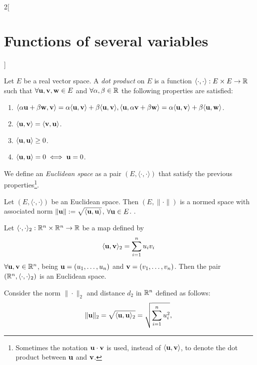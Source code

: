 \documentclass[../../../main.tex]{subfiles}
\begin{document}
\begin{multicols}{2}[\section{Functions of several variables}]
\begin{definition}
Let $E$ be a real vector space. A \textit{dot product} on $E$ is a function $\langle\cdot,\cdot\rangle:E\times E\rightarrow\mathbb{R} $ such that $\forall \vb{u},\vb{v},\vb{w}\in E$ and $\forall\alpha,\beta\in\mathbb{R} $ the following properties are satisfied:
\begin{enumerate}
    \item $\langle \alpha \vb{u}+\beta \vb{w},\vb{v}\rangle=\alpha\langle \vb{u},\vb{v}\rangle+\beta\langle \vb{u},\vb{v}\rangle,\\\langle \vb{u},\alpha \vb{v}+\beta \vb{w}\rangle=\alpha\langle \vb{u},\vb{v}\rangle+\beta\langle \vb{u},\vb{w}\rangle$.
    \item $\langle \vb{u},\vb{v}\rangle=\langle \vb{v},\vb{u}\rangle$.
    \item $\langle \vb{u},\vb{u}\rangle\geq 0$.
    \item $\langle \vb{u},\vb{u}\rangle=0\iff \vb{u}=0$.
\end{enumerate}
We define an \textit{Euclidean space} as a pair $(E,\langle\cdot,\cdot\rangle)$ that satisfy the previous properties\footnote{Sometimes the notation $\vb{u}\cdot \vb{v}$ is used, instead of $\langle \vb{u},\vb{v}\rangle$, to denote the dot product between $\vb{u}$ and $\vb{v}$.}.
\end{definition}
\begin{prop}
Let $(E,\langle\cdot,\cdot\rangle)$ be an Euclidean space. Then $(E,\|\cdot\|)$ is a normed space with associated norm $\|\vb{u}\|:=\sqrt{\langle \vb{u},\vb{u}\rangle}$, $\forall \vb{u}\in E$. .
\end{prop}
\begin{prop}
Let $\langle\cdot,\cdot\rangle_2:\mathbb{R}^n\times\mathbb{R}^n\rightarrow\mathbb{R} $ be a map defined by $$\langle \vb{u},\vb{v}\rangle_2=\sum_{i=1}^nu_iv_i$$ $\forall \vb{u},\vb{v}\in \mathbb{R}^n$, being $\vb{u}=(u_1,\ldots,u_n)$ and $\vb{v}=(v_1,\ldots,v_n)$. Then the pair $(\mathbb{R}^n,\langle\cdot,\cdot\rangle_2)$ is an Euclidean space.
\end{prop}
\begin{corollary}
Consider the norm $\|\cdot\|_2$ and distance $d_2$ in $\mathbb{R}^n$ defined as follows:
\begin{gather*}
    \|\mathblack{u}\|_2=\sqrt{\langle \mathblack{u},\mathblack{u}\rangle_2}=\sqrt{\sum_{i=1}^nu_i^2},\\

\end{gather*}
\end{corollary}
\end{multicols}
\end{document}
